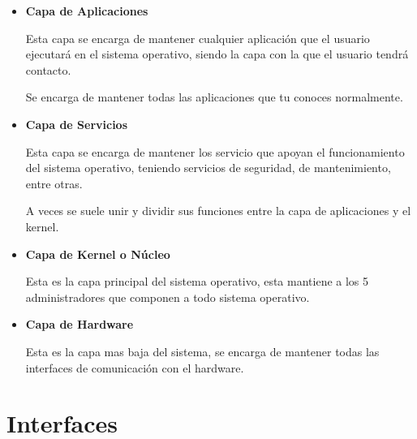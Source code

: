 \documentclass[12pt, fleqn]{report}                             %
\begin{document}
            \begin{itemize}
                \item
                    \textbf{Capa de Aplicaciones}

                    Esta capa se encarga de mantener cualquier aplicación que el usuario ejecutará
                    en el sistema operativo, siendo la capa con la que el usuario tendrá contacto.

                    Se encarga de mantener todas las aplicaciones que tu conoces normalmente.


                \item
                    \textbf{Capa de Servicios}

                    Esta capa se encarga de mantener los servicio que apoyan el funcionamiento
                    del sistema operativo, teniendo servicios de seguridad, de mantenimiento,
                    entre otras.

                    A veces se suele unir y dividir sus funciones entre la capa de aplicaciones
                    y el kernel.


                \item
                    \textbf{Capa de Kernel o Núcleo}

                    Esta es la capa principal del sistema operativo, esta mantiene a los 5
                    administradores que componen a todo sistema operativo.


                \item
                    \textbf{Capa de Hardware}

                    Esta es la capa mas baja del sistema, se encarga de mantener todas las interfaces
                    de comunicación con el hardware.

            \end{itemize}


        \clearpage
        \section{Interfaces}    
            
\end{document}
